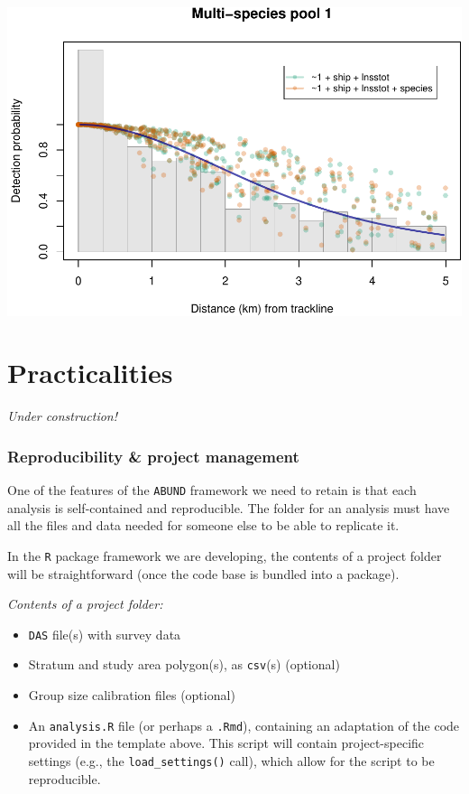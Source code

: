 \documentclass[
]{book}
\providecommand{\tightlist}{%
  \setlength{\itemsep}{0pt}\setlength{\parskip}{0pt}}
\begin{document}
\includegraphics{figures/unnamed-chunk-260-1.pdf}

\hypertarget{practicalities}{%
\chapter{Practicalities}\label{practicalities}}

\emph{Under construction!}

\hypertarget{reproducibility-project-management}{%
\subsection*{Reproducibility \& project management}\label{reproducibility-project-management}}

One of the features of the \texttt{ABUND} framework we need to retain is that each analysis is self-contained and reproducible. The folder for an analysis must have all the files and data needed for someone else to be able to replicate it.

In the \texttt{R} package framework we are developing, the contents of a project folder will be straightforward (once the code base is bundled into a package).

\emph{Contents of a project folder:}

\begin{itemize}
\tightlist
\item
  \texttt{DAS} file(s) with survey data\\
\item
  Stratum and study area polygon(s), as \texttt{csv}(s) (optional)\\
\item
  Group size calibration files (optional)\\
\item
  An \texttt{analysis.R} file (or perhaps a \texttt{.Rmd}), containing an adaptation of the code provided in the template above. This script will contain project-specific settings (e.g., the \texttt{load\_settings()} call), which allow for the script to be reproducible.
\end{itemize}
\end{document}
